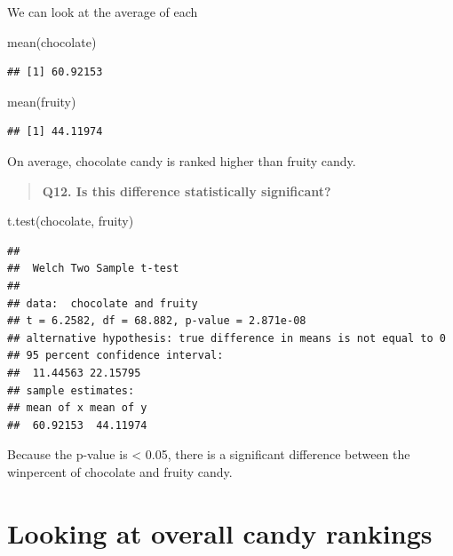 \documentclass[
]{article}
\newenvironment{Shaded}{\begin{snugshade}}{\end{snugshade}}
\newcommand{\FunctionTok}[1]{\textcolor[rgb]{0.00,0.00,0.00}{#1}}
\newcommand{\NormalTok}[1]{#1}
\begin{document}
We can look at the average of each

\begin{Shaded}
\begin{Highlighting}[]
\FunctionTok{mean}\NormalTok{(chocolate)}
\end{Highlighting}
\end{Shaded}

\begin{verbatim}
## [1] 60.92153
\end{verbatim}

\begin{Shaded}
\begin{Highlighting}[]
\FunctionTok{mean}\NormalTok{(fruity)}
\end{Highlighting}
\end{Shaded}

\begin{verbatim}
## [1] 44.11974
\end{verbatim}

On average, chocolate candy is ranked higher than fruity candy.

\begin{quote}
\textbf{Q12. Is this difference statistically significant?}
\end{quote}

\begin{Shaded}
\begin{Highlighting}[]
\FunctionTok{t.test}\NormalTok{(chocolate, fruity)}
\end{Highlighting}
\end{Shaded}

\begin{verbatim}
## 
##  Welch Two Sample t-test
## 
## data:  chocolate and fruity
## t = 6.2582, df = 68.882, p-value = 2.871e-08
## alternative hypothesis: true difference in means is not equal to 0
## 95 percent confidence interval:
##  11.44563 22.15795
## sample estimates:
## mean of x mean of y 
##  60.92153  44.11974
\end{verbatim}

Because the p-value is \textless{} 0.05, there is a significant
difference between the winpercent of chocolate and fruity candy.

\hypertarget{looking-at-overall-candy-rankings}{%
\section{Looking at overall candy
rankings}\label{looking-at-overall-candy-rankings}}
\end{document}
